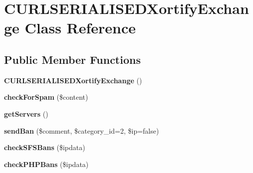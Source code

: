\hypertarget{class_c_u_r_l_s_e_r_i_a_l_i_s_e_d_xortify_exchange}{\section{C\-U\-R\-L\-S\-E\-R\-I\-A\-L\-I\-S\-E\-D\-Xortify\-Exchange Class Reference}
\label{class_c_u_r_l_s_e_r_i_a_l_i_s_e_d_xortify_exchange}
}
\subsection*{Public Member Functions}
\begin{DoxyCompactItemize}
\item 
\hypertarget{class_c_u_r_l_s_e_r_i_a_l_i_s_e_d_xortify_exchange_a2d9a2fd0a191b4f2ca7f75a0ac930ffb}{{\bfseries C\-U\-R\-L\-S\-E\-R\-I\-A\-L\-I\-S\-E\-D\-Xortify\-Exchange} ()}\label{class_c_u_r_l_s_e_r_i_a_l_i_s_e_d_xortify_exchange_a2d9a2fd0a191b4f2ca7f75a0ac930ffb}

\item 
\hypertarget{class_c_u_r_l_s_e_r_i_a_l_i_s_e_d_xortify_exchange_a7a4f53c3841dc7806455261af557d514}{{\bfseries check\-For\-Spam} (\$content)}\label{class_c_u_r_l_s_e_r_i_a_l_i_s_e_d_xortify_exchange_a7a4f53c3841dc7806455261af557d514}

\item 
\hypertarget{class_c_u_r_l_s_e_r_i_a_l_i_s_e_d_xortify_exchange_a882f365bc81e207dc2123ef707735e82}{{\bfseries get\-Servers} ()}\label{class_c_u_r_l_s_e_r_i_a_l_i_s_e_d_xortify_exchange_a882f365bc81e207dc2123ef707735e82}

\item 
\hypertarget{class_c_u_r_l_s_e_r_i_a_l_i_s_e_d_xortify_exchange_a0293acfa4afe0cb5b2816352a35d8ca7}{{\bfseries send\-Ban} (\$comment, \$category\-\_\-id=2, \$ip=false)}\label{class_c_u_r_l_s_e_r_i_a_l_i_s_e_d_xortify_exchange_a0293acfa4afe0cb5b2816352a35d8ca7}

\item 
\hypertarget{class_c_u_r_l_s_e_r_i_a_l_i_s_e_d_xortify_exchange_a985a563a84e3e5c54694fcce192bda53}{{\bfseries check\-S\-F\-S\-Bans} (\$ipdata)}\label{class_c_u_r_l_s_e_r_i_a_l_i_s_e_d_xortify_exchange_a985a563a84e3e5c54694fcce192bda53}

\item 
\hypertarget{class_c_u_r_l_s_e_r_i_a_l_i_s_e_d_xortify_exchange_aeb1bf9aaee4718870adbd07333490aaf}{{\bfseries check\-P\-H\-P\-Bans} (\$ipdata)}\label{class_c_u_r_l_s_e_r_i_a_l_i_s_e_d_xortify_exchange_aeb1bf9aaee4718870adbd07333490aaf}


\end{DoxyCompactItemize}
